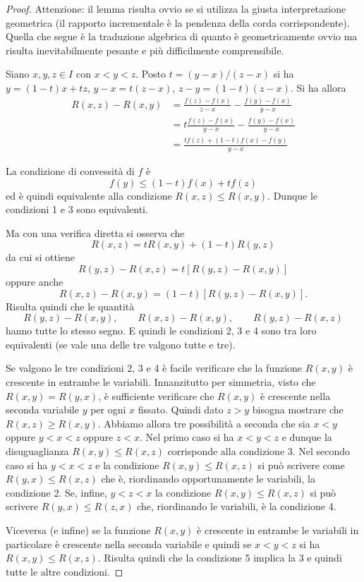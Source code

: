 \begin{proof}
Attenzione:
il lemma risulta ovvio se si utilizza la giusta interpretazione geometrica
(il rapporto incrementale è la pendenza della corda corrispondente).
Quella che segue è la traduzione algebrica di quanto
è geometricamente ovvio ma risulta inevitabilmente pesante
e più difficilmente comprensibile.

Siano $x,y,z\in I$ con $x<y<z$.
Posto $t=(y-x)/(z-x)$ si ha $y=(1-t)x + tz$,
 $y-x = t(z-x)$, $z-y = (1-t)(z-x)$.
Si ha allora
 \begin{equation*}
 \begin{aligned}
 R(x,z) - R(x,y)
 &= \frac{f(z)-f(x)}{z-x} - \frac{f(y)-f(x)}{y-x} \\
  &= t\frac{f(z)-f(x)}{y-x} - \frac{f(y)-f(x)}{y-x} \\
  &= \frac{tf(z) + (1-t) f(x) - f(y)}{y-x}
 \end{aligned}
 \end{equation*}

La condizione di convessità di $f$ è
\[
  f(y) \le (1-t)f(x) + tf(z)
\]
ed è quindi equivalente alla condizione $R(x,z) \le R(x,y)$.
Dunque le condizioni 1 e 3 sono equivalenti.

Ma con una verifica diretta si osserva che
\[
  R(x,z) = t R(x,y) + (1-t) R(y,z)
\]
da cui si ottiene
\[
  R(y,z) - R(x,z) = t[R(y,z) - R(x,y)]
\]
oppure anche
\[
 R(x,z) - R(x,y) = (1-t) [R(y,z) - R(x,y)].
\]
Risulta quindi che le quantità
\[
  R(y,z) - R(x,y), \qquad
  R(x,z) - R(x,y), \qquad
  R(y,z) - R(x,z)
\]
hanno tutte lo stesso segno. E quindi le condizioni 2, 3 e 4 sono tra loro equivalenti (se vale una delle tre valgono tutte e tre).

Se valgono le tre condizioni 2, 3 e 4 è facile verificare che la funzione $R(x,y)$ è crescente in entrambe le variabili. Innanzitutto per simmetria, visto che $R(x,y) = R(y,x)$, è sufficiente verificare che $R(x,y)$ è crescente nella seconda variabile $y$ per ogni $x$ fissato. Quindi dato $z>y$ bisogna mostrare che $R(x,z) \ge R(x,y)$.
Abbiamo allora tre possibilità a seconda che sia $x<y$ oppure $y<x<z$ oppure $z<x$. Nel primo caso si ha $x<y<z$ e dunque la disuguaglianza $R(x,y) \le R(x,z)$ corrisponde alla condizione 3.
Nel secondo caso si ha $y<x<z$ e la condizione $R(x,y)\le R(x,z)$ si può scrivere come $R(y,x) \le R(x,z)$ che è, riordinando opportunamente le variabili, la condizione 2. Se, infine, $y < z < x$ la condizione $R(x,y) \le R(x,z)$ si può scrivere $R(y,x) \le R(z,x)$ che, riordinando le variabili, è la condizione 4.

Viceversa (e infine) se la funzione $R(x,y)$ è crescente in entrambe le variabili in particolare è crescente nella seconda variabile e quindi se $x<y<z$ si ha $R(x,y) \le R(x,z)$. Risulta quindi che la condizione 5 implica la 3 e quindi tutte le altre condizioni.
\end{proof}

